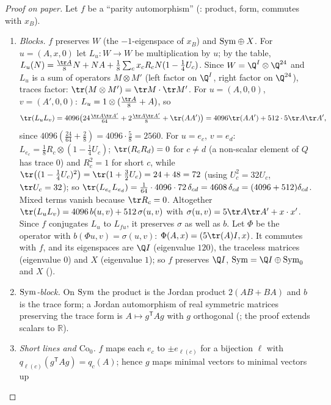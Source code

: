 \begin{proof}[Proof on paper]
Let $f$ be a ``parity automorphism'' (: product, form, commutes with $x_B$).
\begin{enumerate}[label=(\alph*)]
\item \emph{Blocks.}  $f$ preserves $W$ (the $-1$-eigenspace of $x_B$) and $\mathrm{Sym}\oplus X$.  For
  $u=(A,x,0)$ let $L_u:W\to W$ be multiplication by $u$; by the table,
  $L_u(N)=\tfrac{\tr A}8N+NA+\tfrac18\sum_cx_cR_cN(1-\tfrac14U_c)$.  Since $W=\Q^I\otimes\Q^{24}$ and $L_u$ is
  a sum of operators $M\otimes M'$ (left factor on $\Q^I$, right factor on $\Q^{24}$), traces factor:
  $\tr(M\otimes M')=\tr M\cdot\tr M'$.  For $u=(A,0,0)$, $v=(A',0,0)$: $L_u=1\otimes(\tfrac{\tr A}8+A)$, so
  \begin{equation*}
    \tr(L_uL_v)=4096\bigl(24\tfrac{\tr A\tr A'}{64}+2\tfrac{\tr A\tr A'}8+\tr(AA')\bigr)
    =4096\tr(AA')+512\cdot5\tr A\tr A',
  \end{equation*}
  since $4096(\tfrac{24}{64}+\tfrac28)=4096\cdot\tfrac58=2560$.  For $u=e_c$, $v=e_d$:
  $L_{e_c}=\tfrac18R_c\otimes(1-\tfrac14U_c)$; $\tr(R_cR_d)=0$ for $c\neq d$ (a non-scalar element of $Q$
  has trace $0$) and $R_c^2=1$ for short $c$, while
  $\tr\bigl((1-\tfrac14U_c)^2\bigr)=\tr(1+\tfrac32U_c)=24+48=72$ (using $U_c^2=32U_c$, $\tr U_c=32$); so
  $\tr(L_{e_c}L_{e_d})=\tfrac1{64}\cdot4096\cdot72\,\delta_{cd}=4608\,\delta_{cd}=(4096+512)\delta_{cd}$.  Mixed
  terms vanish because $\tr R_c=0$.  Altogether
  $\tr(L_uL_v)=4096\,b(u,v)+512\,\sigma(u,v)$ with $\sigma(u,v)=5\tr A\tr A'+x\cdot x'$.  Since $f$ conjugates
  $L_u$ to $L_{fu}$, it preserves $\sigma$ as well as $b$.  Let $\Phi$ be the operator with
  $b(\Phi u,v)=\sigma(u,v)$: $\Phi(A,x)=(5\tr(A)I,x)$.  It commutes with $f$, and its eigenspaces are
  $\Q I$ (eigenvalue $120$), the traceless matrices (eigenvalue $0$) and $X$ (eigenvalue $1$); so $f$
  preserves $\Q I$, $\chXXISym=\Q I\oplus\chXXISym_0$ and $X$ ().
\item \emph{$\mathrm{Sym}$-block.}  On $\mathrm{Sym}$ the product is the Jordan product $2(AB+BA)$ and $b$ is the trace form;
  a Jordan automorphism of real symmetric matrices preserving the trace form is $A\mapsto g^{\mathsf T}Ag$
  with $g$ orthogonal (; the proof extends scalars to $\mathbb{R}$).
\item \emph{Short lines and $\mathrm{Co}_0$.}  $f$ maps each $e_c$ to $\pm e_{\ell(c)}$ for a bijection
  $\ell$ with $q_{\ell(c)}(g^{\mathsf T}Ag)=q_c(A)$; hence $g$ maps minimal vectors to minimal vectors up

\end{enumerate}
\end{proof}
